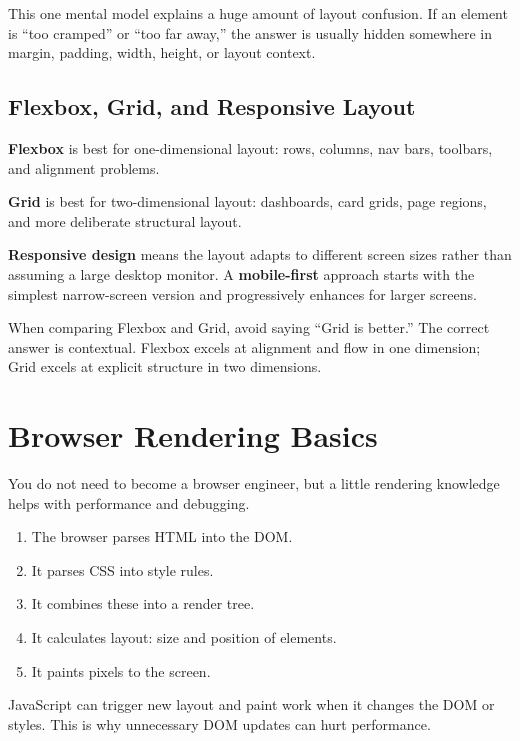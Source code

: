 \documentclass[12pt, a4paper, oneside]{book}
\begin{document}
This one mental model explains a huge amount of layout confusion. If an element is ``too cramped'' or ``too far away,'' the answer is usually hidden somewhere in margin, padding, width, height, or layout context.

\subsection{Flexbox, Grid, and Responsive Layout}
\textbf{Flexbox} is best for one-dimensional layout: rows, columns, nav bars, toolbars, and alignment problems.

\textbf{Grid} is best for two-dimensional layout: dashboards, card grids, page regions, and more deliberate structural layout.

\textbf{Responsive design} means the layout adapts to different screen sizes rather than assuming a large desktop monitor. A \textbf{mobile-first} approach starts with the simplest narrow-screen version and progressively enhances for larger screens.

\begin{examtipbox}
When comparing Flexbox and Grid, avoid saying ``Grid is better.'' The correct answer is contextual. Flexbox excels at alignment and flow in one dimension; Grid excels at explicit structure in two dimensions.
\end{examtipbox}

\section{Browser Rendering Basics}

You do not need to become a browser engineer, but a little rendering knowledge helps with performance and debugging.

\begin{enumerate}[leftmargin=2em]
    \item The browser parses HTML into the DOM.
    \item It parses CSS into style rules.
    \item It combines these into a render tree.
    \item It calculates layout: size and position of elements.
    \item It paints pixels to the screen.
\end{enumerate}

JavaScript can trigger new layout and paint work when it changes the DOM or styles. This is why unnecessary DOM updates can hurt performance.
\end{document}
